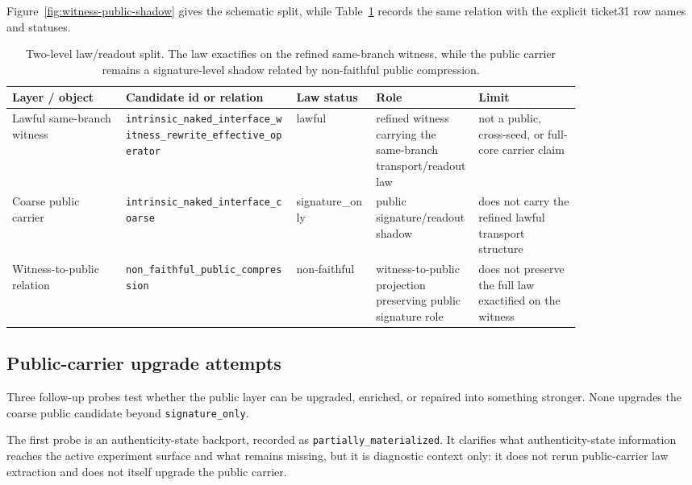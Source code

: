 \documentclass[11pt]{article}
\theoremstyle{definition}
\begin{document}
Figure~\ref{fig:witness-public-shadow} gives the schematic split, while
Table~\ref{tab:witness-public-shadow-split} records the same relation with the explicit
ticket31 row names and statuses.

\begin{table}[t]
\centering
\footnotesize
\caption{Two-level law/readout split. The law exactifies on the refined same-branch
witness, while the public carrier remains a signature-level shadow related by
non-faithful public compression.}
\label{tab:witness-public-shadow-split}
\begin{tabularx}{\linewidth}{@{}>{\raggedright\arraybackslash}p{0.20\linewidth}>{\raggedright\arraybackslash}p{0.30\linewidth}>{\raggedright\arraybackslash}p{0.14\linewidth}>{\raggedright\arraybackslash}p{0.18\linewidth}>{\raggedright\arraybackslash}X@{}}
\toprule
Layer / object & Candidate id or relation & Law status & Role & Limit \\
\midrule
Lawful same-branch witness & \nolinkurl{intrinsic_naked_interface_witness_rewrite_effective_operator} & lawful & refined witness carrying the same-branch transport/readout law & not a public, cross-seed, or full-core carrier claim \\
Coarse public carrier & \nolinkurl{intrinsic_naked_interface_coarse} & signature\_only & public signature/readout shadow & does not carry the refined lawful transport structure \\
Witness-to-public relation & \nolinkurl{non_faithful_public_compression} & non-faithful & witness-to-public projection preserving public signature role & does not preserve the full law exactified on the witness \\
\bottomrule
\end{tabularx}
\end{table}

\subsection{Public-carrier upgrade attempts}

Three follow-up probes test whether the public layer can be upgraded, enriched, or
repaired into something stronger. None upgrades the coarse public candidate beyond
\texttt{signature\_only}.

The first probe is an authenticity-state backport, recorded as
\texttt{partially\_materialized}. It clarifies what authenticity-state information
reaches the active experiment surface and what remains missing, but it is diagnostic
context only: it does not rerun public-carrier law extraction and does not itself
upgrade the public carrier.
\end{document}
